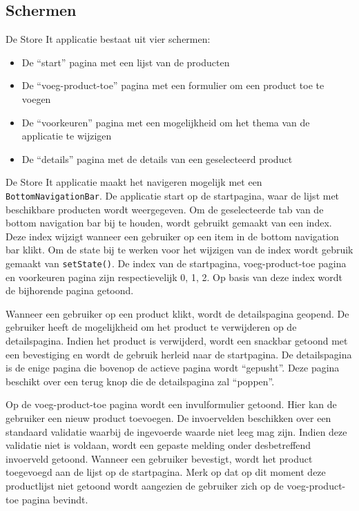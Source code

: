 \subsection*{Schermen}
De Store It applicatie bestaat uit vier schermen: 
\begin{itemize}
    \item De ``start'' pagina met een lijst van de producten
    \item De ``voeg-product-toe'' pagina met een formulier om een product toe te voegen
    \item De ``voorkeuren'' pagina met een mogelijkheid om het thema van de applicatie te wijzigen
    \item De ``details'' pagina met de details van een geselecteerd product
\end{itemize}

De Store It applicatie maakt het navigeren mogelijk met een \verb|BottomNavigationBar|. De applicatie start op de startpagina, waar de lijst met beschikbare producten wordt weergegeven. Om de geselecteerde tab van de bottom navigation bar bij te houden, wordt gebruikt gemaakt van een index. Deze index wijzigt wanneer een gebruiker op een item in de bottom navigation bar klikt. Om de state bij te werken voor het wijzigen van de index wordt gebruik gemaakt van \verb|setState()|. De index van de startpagina, voeg-product-toe pagina en voorkeuren pagina zijn respectievelijk 0, 1, 2.
Op basis van deze index wordt de bijhorende pagina getoond.

Wanneer een gebruiker op een product klikt, wordt de detailspagina geopend. \newline
De gebruiker heeft de mogelijkheid om het product te verwijderen op de detailspagina. Indien het product is verwijderd, wordt een snackbar getoond met een bevestiging en wordt de gebruik herleid naar de startpagina.
De detailspagina is de enige pagina die bovenop de actieve pagina wordt ``gepusht''. Deze pagina beschikt over een terug knop die de detailspagina zal ``poppen''.

Op de voeg-product-toe pagina wordt een invulformulier getoond. Hier kan de gebruiker een nieuw product toevoegen. De invoervelden beschikken over een standaard validatie waarbij de ingevoerde waarde niet leeg mag zijn. Indien deze validatie niet is voldaan, wordt een gepaste melding onder desbetreffend invoerveld getoond. \newline
Wanneer een gebruiker bevestigt, wordt het product toegevoegd aan de lijst op de startpagina. Merk op dat op dit moment deze productlijst niet getoond wordt aangezien de gebruiker zich op de voeg-product-toe pagina bevindt.

